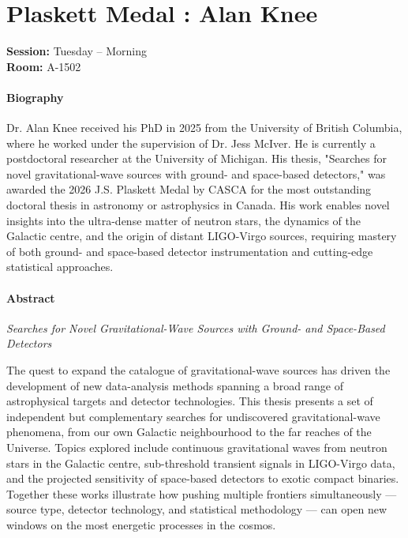 
\hypertarget{invited-alan-knee}{}
\label{invited-page-alan-knee}
\section{Plaskett Medal : Alan Knee}
\textbf{Session:}{ Tuesday -- Morning}\\
\textbf{Room:} A-1502\\

\paragraph{Biography}
{\sffamily
Dr. Alan Knee received his PhD in 2025 from the University of British Columbia, where he worked under the supervision of Dr. Jess McIver. He is currently a postdoctoral researcher at the University of Michigan. His thesis, "Searches for novel gravitational-wave sources with ground- and space-based detectors," was awarded the 2026 J.S. Plaskett Medal by CASCA for the most outstanding doctoral thesis in astronomy or astrophysics in Canada. His work enables novel insights into the ultra-dense matter of neutron stars, the dynamics of the Galactic centre, and the origin of distant LIGO-Virgo sources, requiring mastery of both ground- and space-based detector instrumentation and cutting-edge statistical approaches.
}

\paragraph{Abstract}
{\itshape
Searches for Novel Gravitational-Wave Sources with Ground- and Space-Based Detectors

The quest to expand the catalogue of gravitational-wave sources has driven the development of new data-analysis methods spanning a broad range of astrophysical targets and detector technologies. This thesis presents a set of independent but complementary searches for undiscovered gravitational-wave phenomena, from our own Galactic neighbourhood to the far reaches of the Universe. Topics explored include continuous gravitational waves from neutron stars in the Galactic centre, sub-threshold transient signals in LIGO-Virgo data, and the projected sensitivity of space-based detectors to exotic compact binaries. Together these works illustrate how pushing multiple frontiers simultaneously — source type, detector technology, and statistical methodology — can open new windows on the most energetic processes in the cosmos.
}


\hypertarget{invited-samantha-lawler-prized}{}
\label{invited-page-samantha-lawler-prized}
